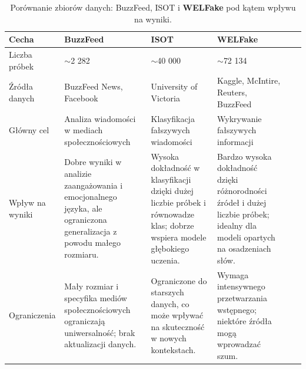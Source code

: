 \begin{table}[h!]
	\raggedright
	\begin{tabular}{|p{2.5cm}|p{3.5cm}|p{2.5cm}|p{3cm}|p{2.5cm}|p{2.5cm}|}
		\hline
		\textbf{Cecha}  & \textbf{BuzzFeed}                                                                                                     & \textbf{ISOT}                                                                                                             & \textbf{\textbf{WELFake}}                                                                                                     \\ \hline
		Liczba próbek   & $\sim$2 282                                                                                                           & $\sim$40 000                                                                                                              & $\sim$72 134                                                                                                                  \\ \hline
		Źródła danych   & BuzzFeed News, Facebook                                                                                               & University of Victoria                                                                                                    & Kaggle, McIntire, Reuters, BuzzFeed                                                                                           \\ \hline
		Główny cel      & Analiza wiadomości w mediach społecznościowych                                                                        & Klasyfikacja fałszywych wiadomości                                                                                        & Wykrywanie fałszywych informacji                                                                                              \\ \hline
		Wpływ na wyniki & Dobre wyniki w analizie zaangażowania i emocjonalnego języka, ale ograniczona generalizacja z powodu małego rozmiaru. & Wysoka dokładność w klasyfikacji dzięki dużej liczbie próbek i równowadze klas; dobrze wspiera modele głębokiego uczenia. & Bardzo wysoka dokładność dzięki różnorodności źródeł i dużej liczbie próbek; idealny dla modeli opartych na osadzeniach słów. \\ \hline
		Ograniczenia    & Mały rozmiar i specyfika mediów społecznościowych ograniczają uniwersalność; brak aktualizacji danych.                & Ograniczone do starszych danych, co może wpływać na skuteczność w nowych kontekstach.                                     & Wymaga intensywnego przetwarzania wstępnego; niektóre źródła mogą wprowadzać szum.                                            \\ \hline
	\end{tabular}
	\caption{Porównanie zbiorów danych: BuzzFeed, ISOT i \textbf{WELFake} pod kątem wpływu na wyniki.}
	\label{tab:porownanie_zbiorow}
\end{table}

\FloatBarrier